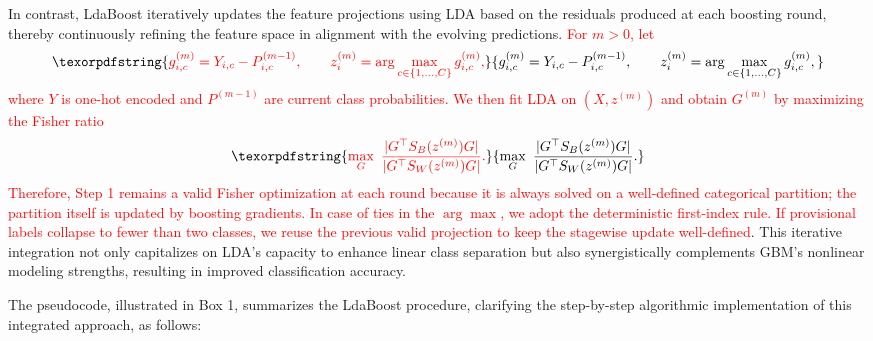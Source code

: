 \documentclass[11pt,a4paper]{article}
\providecommand{\DIFaddtex}[1]{\textcolor{red}{#1}} %
\providecommand{\DIFaddbegin}{} %
\providecommand{\DIFaddend}{} %
\providecommand{\DIFadd}[1]{\texorpdfstring{\DIFaddtex{#1}}{#1}} %
\begin{document}
In contrast, LdaBoost iteratively updates the feature projections using LDA based on the residuals produced at each boosting round, thereby continuously refining the feature space in alignment with the evolving predictions.  
 \DIFaddbegin \DIFadd{For $m>0$, let
}\[
\DIFadd{g^{(m)}_{i,c} = Y_{i,c} - P^{(m-1)}_{i,c}, \qquad
z^{(m)}_i = \arg\max_{c\in\{1,\dots,C\}} g^{(m)}_{i,c},
}\]
\DIFadd{where $Y$ is one-hot encoded and $P^{(m-1)}$ are current class probabilities. We then fit LDA on $(X, z^{(m)})$ and obtain $G^{(m)}$ by maximizing the Fisher ratio
}\[
\DIFadd{\max_G\ \frac{|G^\top S_B(z^{(m)})G|}{|G^\top S_W(z^{(m)})G|}.
}\]
\DIFadd{Therefore, Step 1 remains a valid Fisher optimization at each round because it is always solved on a well-defined categorical partition; the partition itself is updated by boosting gradients. In case of ties in the $\arg\max$, we adopt the deterministic first-index rule. If provisional labels collapse to fewer than two classes, we reuse the previous valid projection to keep the stagewise update well-defined}\DIFaddend .  
This iterative integration not only capitalizes on LDA’s capacity to enhance linear class separation but also synergistically complements GBM’s nonlinear modeling strengths, resulting in improved classification accuracy.  

The pseudocode, illustrated in Box 1, summarizes the LdaBoost procedure, clarifying the step-by-step algorithmic implementation of this integrated approach, as follows:
\end{document}
